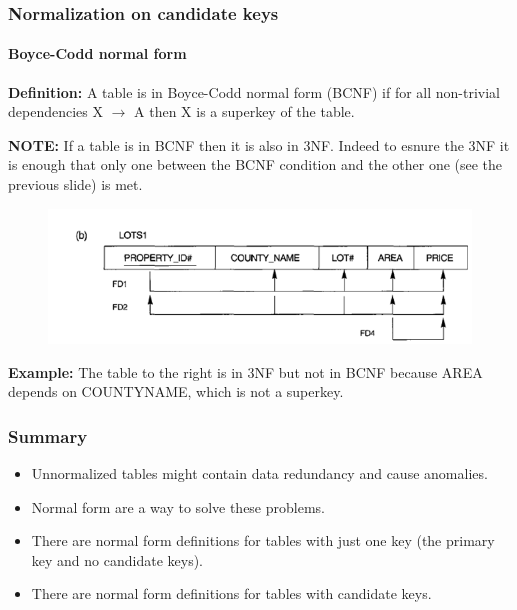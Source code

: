 \documentclass{beamer}
\newcommand{\fdep}[2]{#1 $\rightarrow$ #2}
\begin{document}
\begin{frame}
	\frametitle{Normalization on candidate keys}
	\framesubtitle{Boyce-Codd normal form}
	
	\textbf{Definition:} A table is in Boyce-Codd normal form (BCNF) if for all non-trivial dependencies \fdep{X}{A} then X is a superkey of the table.
	
	\textbf{NOTE:} If a table is in BCNF then it is also in 3NF. Indeed to esnure the 3NF it is enough that only one between the BCNF condition and the other one (see the previous slide) is met.
	
	\begin{figure}
		\begin{center}
			\includegraphics[scale=0.3]{img/normalization/norm13}
		\end{center}
	\end{figure}
	
	\textbf{Example:} The table to the right is in 3NF but not in BCNF because AREA depends on COUNTY\textunderscore NAME, which is not a superkey.
	
\end{frame}


\begin{frame}
	\frametitle{Summary}
	\begin{itemize}
		\item Unnormalized tables might contain data redundancy and cause anomalies.
		\item Normal form are a way to solve these problems.
		\item There are normal form definitions for tables with just one key (the primary key and no candidate keys).
		\item There are normal form definitions for tables with candidate keys.
	\end{itemize}
\end{frame}
\end{document}
